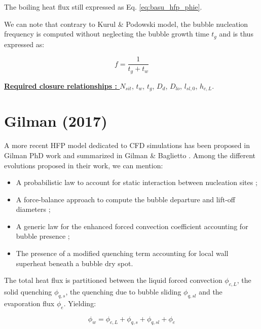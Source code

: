 The boiling heat flux still expressed as Eq. \ref{eq:basu_hfp_phie}.

\npar

\begin{remark*}{}
We can note that contrary to  Kurul \& Podowski model, the bubble nucleation frequency is computed without neglecting the bubble growth time $t_{g}$ and is thus expressed as:

\begin{equation}
f = \dfrac{1}{t_{g} + t_{w}}
\end{equation}
\end{remark*}

\textbf{\underline{Required closure relationships : }} $N_{sit}$, $t_{w}$, $t_{g}$, $D_{d}$, $D_{lo}$, $l_{sl,0}$, $h_{c,L}$. 



\section{Gilman (2017)}

A more recent HFP model dedicated to CFD simulations has been proposed in Gilman PhD work \cite{gilman_phd} and summarized in Gilman \& Baglietto \cite{gilman_self-consistent_2017}. Among the different evolutions proposed in their work, we can mention:

\begin{itemize}
\item A probabilistic law to account for static interaction between nucleation sites ;
\item A force-balance approach to compute the bubble departure and lift-off diameters ;
\item A generic law for the enhanced forced convection coefficient accounting for bubble presence ; 
\item The presence of a modified quenching term accounting for local wall superheat beneath a bubble dry spot.
\end{itemize}

The total heat flux is partitioned between the liquid forced convection $\phi_{c,L}$, the solid quenching $\phi_{q,s}$, the quenching due to bubble sliding $\phi_{q,sl}$ and the evaporation flux $\phi_{e}$. Yielding:

\begin{equation}
\phi_{w} = \phi_{c,L} + \phi_{q,s} + \phi_{q,sl} + \phi_{e}
\label{eq:gilman_hfp_phiw}
\end{equation} 


